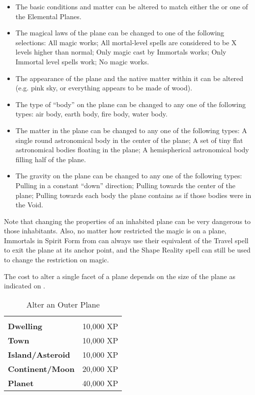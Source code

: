 \begin{multicols*}{2}
\begin{itemize}
	\item{The basic conditions and matter can be altered to match either the  or one of the Elemental Planes.}
	\item{The magical laws of the plane can be changed to one of the following selections: All magic works; All mortal-level spells are considered to be X levels higher than normal; Only magic cast by Immortals works; Only Immortal level spells work; No magic works.}
	\item{The appearance of the plane and the native matter within it can be altered (e.g. pink sky, or everything appears to be made of wood).}
	\item{The type of “body” on the plane can be changed to any one of the following types: air body, earth body, fire body, water body.}
	\item{The matter in the plane can be changed to any one of the following types: A single round astronomical body in the center of the plane; A set of tiny flat astronomical bodies floating in the plane; A hemispherical astronomical body filling half of the plane.}
	\item{The gravity on the plane can be changed to any one of the following types: Pulling in a constant “down” direction; Pulling towards the center of the plane; Pulling towards each body the plane contains as if those bodies were in the Void.}
\end{itemize}
Note that changing the properties of an inhabited plane can be very dangerous to those inhabitants. Also, no matter how restricted the magic is on a plane, Immortals in Spirit Form from can always use their equivalent of the Travel spell to exit the plane at its anchor point, and the Shape Reality spell can still be used to change the restriction on magic.

The cost to alter a single facet of a plane depends on the size of the plane as indicated on .

\begin {table}[H]
  \caption{Alter an Outer Plane}\label{tab:Alter an Outer Plane}
  \begin{tabularx}{\columnwidth}{>{\bfseries}YY}
	 & \\
	Dwelling & 10,000 XP\\
	Town & 10,000 XP\\
	Island/Asteroid & 10,000 XP\\
	Continent/Moon & 20,000 XP\\
	Planet & 40,000 XP
  \end {tabularx}
\end {table}


\end{multicols*}
